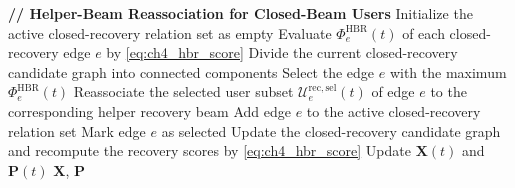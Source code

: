 \begin{algorithm}[H]
\begin{algorithmic}[1]
    \State \textbf{// Helper-Beam Reassociation for Closed-Beam Users}
    \State Initialize the active closed-recovery relation set as empty
    \State Evaluate $\Phi_e^{\mathrm{HBR}}(t)$ of each closed-recovery edge $e$ by \eqref{eq:ch4_hbr_score}
        \State Divide the current closed-recovery candidate graph into connected components
            \State Select the edge $e$ with the maximum $\Phi_e^{\mathrm{HBR}}(t)$
            \State Reassociate the selected user subset $\mathcal{U}_e^{\mathrm{rec,sel}}(t)$ of edge $e$ to the corresponding helper recovery beam
            \State Add edge $e$ to the active closed-recovery relation set
            \State Mark edge $e$ as selected
        \EndFor
        \State Update the closed-recovery candidate graph and recompute the recovery scores by \eqref{eq:ch4_hbr_score}
    \EndWhile
    \State Update $\mathbf{X}(t)$ and $\mathbf{P}(t)$
\EndFor
\State \Return $\mathbf{X}$, $\mathbf{P}$
\end{algorithmic}
\end{algorithm}